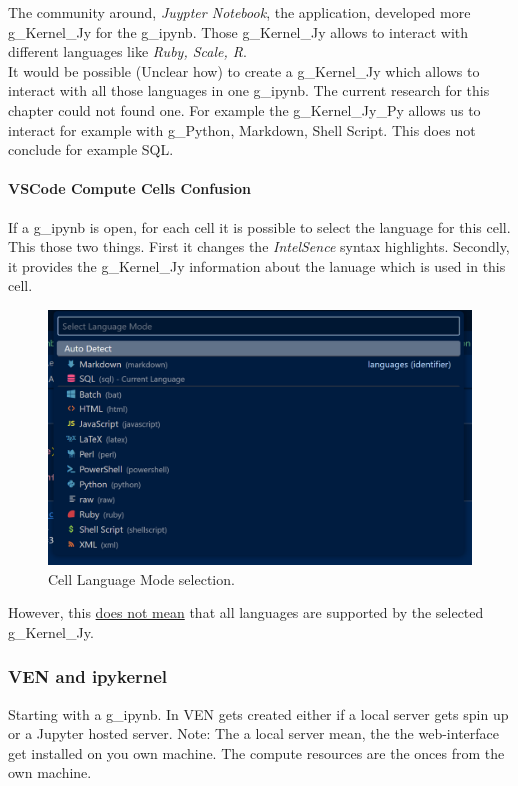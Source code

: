 The community around, \textit{Juypter Notebook}, the application, developed more \gls{g_Kernel_Jy} for the \gls{g_ipynb}. Those \gls{g_Kernel_Jy} allows to interact with different languages like \textit{Ruby, Scale, R}.\\

It would be possible (Unclear how) to create a \gls{g_Kernel_Jy} which allows to interact with all those languages in one \gls{g_ipynb}. The current research for this chapter could not found one. For example the \gls{g_Kernel_Jy_Py} allows us to interact for example with \gls{g_Python}, Markdown, Shell Script. This does not conclude for example \gls{SQL}.

\paragraph{VSCode Compute Cells Confusion}
If a \gls{g_ipynb} is open, for each cell it is possible to select the language for this cell. This those two things. First it changes the \textit{IntelSence} syntax highlights. Secondly, it provides the \gls{g_Kernel_Jy} information about the lanuage which is used in this cell.

\begin{figure}[H]
	\centering
	\includegraphics[scale = 0.3]{attachment/chapter_AML/Scc007}
	\caption{Cell Language Mode selection.}
\end{figure}

However, this \underline{does not mean} that all languages are supported by the selected \gls{g_Kernel_Jy}. 

\subsubsection{VEN and ipykernel}
Starting with a \gls{g_ipynb}. In \gls{VEN} gets created either if a local server gets spin up or a Jupyter hosted server. Note: The a local server mean, the the web-interface get installed on you own machine. The compute resources are the onces from the own machine.

